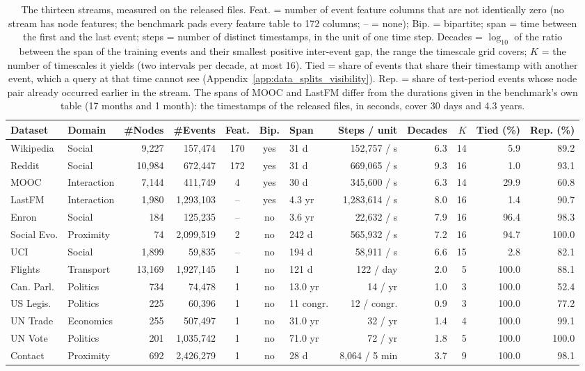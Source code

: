 \begin{table}[t]
\caption{The thirteen streams, measured on the released files. Feat. = number of event feature columns that are not identically zero (no stream has node features; the benchmark pads every feature table to 172 columns; -- = none); Bip. = bipartite; span = time between the first and the last event; steps = number of distinct timestamps, in the unit of one time step. Decades = $\log_{10}$ of the ratio between the span of the training events and their smallest positive inter-event gap, the range the timescale grid covers; $K$ = the number of timescales it yields (two intervals per decade, at most 16). Tied = share of events that share their timestamp with another event, which a query at that time cannot see (Appendix~\ref{app:data_splits_visibility}). Rep. = share of test-period events whose node pair already occurred earlier in the stream. The spans of MOOC and LastFM differ from the durations given in the benchmark's own table (17 months and 1 month): the timestamps of the released files, in seconds, cover 30 days and 4.3 years.}
\label{tab:datasets}
\centering
\scriptsize
\setlength{\tabcolsep}{1.5pt}
\begin{tabular}{llrrcclrrrrr}
\toprule
Dataset & Domain & \#Nodes & \#Events & Feat. & Bip. & Span & Steps / unit & Decades & $K$ & Tied (\%) & Rep. (\%) \\
\midrule
Wikipedia & Social & 9,227 & 157,474 & 170 & yes & 31 d & 152,757 / s & 6.3 & 14 & 5.9 & 89.2 \\
Reddit & Social & 10,984 & 672,447 & 172 & yes & 31 d & 669,065 / s & 9.3 & 16 & 1.0 & 93.1 \\
MOOC & Interaction & 7,144 & 411,749 & 4 & yes & 30 d & 345,600 / s & 6.3 & 14 & 29.9 & 60.8 \\
LastFM & Interaction & 1,980 & 1,293,103 & -- & yes & 4.3 yr & 1,283,614 / s & 8.0 & 16 & 1.4 & 90.7 \\
Enron & Social & 184 & 125,235 & -- & no & 3.6 yr & 22,632 / s & 7.9 & 16 & 96.4 & 98.3 \\
Social Evo. & Proximity & 74 & 2,099,519 & 2 & no & 242 d & 565,932 / s & 7.2 & 16 & 94.7 & 100.0 \\
UCI & Social & 1,899 & 59,835 & -- & no & 194 d & 58,911 / s & 6.6 & 15 & 2.8 & 82.1 \\
Flights & Transport & 13,169 & 1,927,145 & 1 & no & 121 d & 122 / day & 2.0 & 5 & 100.0 & 88.1 \\
Can. Parl. & Politics & 734 & 74,478 & 1 & no & 13.0 yr & 14 / yr & 1.0 & 3 & 100.0 & 52.4 \\
US Legis. & Politics & 225 & 60,396 & 1 & no & 11 congr. & 12 / congr. & 0.9 & 3 & 100.0 & 77.2 \\
UN Trade & Economics & 255 & 507,497 & 1 & no & 31.0 yr & 32 / yr & 1.4 & 4 & 100.0 & 99.1 \\
UN Vote & Politics & 201 & 1,035,742 & 1 & no & 71.0 yr & 72 / yr & 1.8 & 5 & 100.0 & 100.0 \\
Contact & Proximity & 692 & 2,426,279 & 1 & no & 28 d & 8,064 / 5 min & 3.7 & 9 & 100.0 & 98.1 \\
\bottomrule
\end{tabular}
\end{table}
